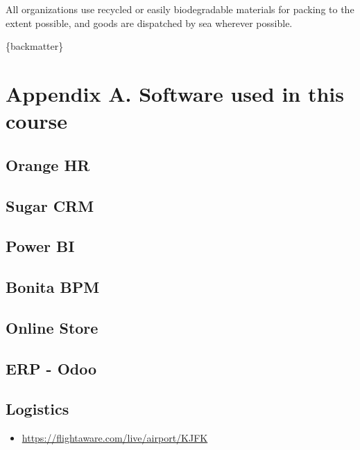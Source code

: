\documentclass[]{book}
\providecommand{\tightlist}{%
  \setlength{\itemsep}{0pt}\setlength{\parskip}{0pt}}
\begin{document}
All organizations use recycled or easily biodegradable materials for packing to the extent possible, and goods are dispatched by sea wherever possible.

\{backmatter\}

\hypertarget{appendix-appendix}{%
\appendix}


\hypertarget{appendix-a.-software-used-in-this-course}{%
\chapter{Appendix A. Software used in this course}\label{appendix-a.-software-used-in-this-course}}

\hypertarget{orange-hr}{%
\section{Orange HR}\label{orange-hr}}

\hypertarget{sugar-crm}{%
\section{Sugar CRM}\label{sugar-crm}}

\hypertarget{power-bi}{%
\section{Power BI}\label{power-bi}}

\hypertarget{bonita-bpm}{%
\section{Bonita BPM}\label{bonita-bpm}}

\hypertarget{online-store-1}{%
\section{Online Store}\label{online-store-1}}

\hypertarget{erp---odoo}{%
\section{ERP - Odoo}\label{erp---odoo}}

\hypertarget{logistics-1}{%
\section{Logistics}\label{logistics-1}}

\begin{itemize}
\tightlist
\item
  \url{https://flightaware.com/live/airport/KJFK}
\end{itemize}


\end{document}
